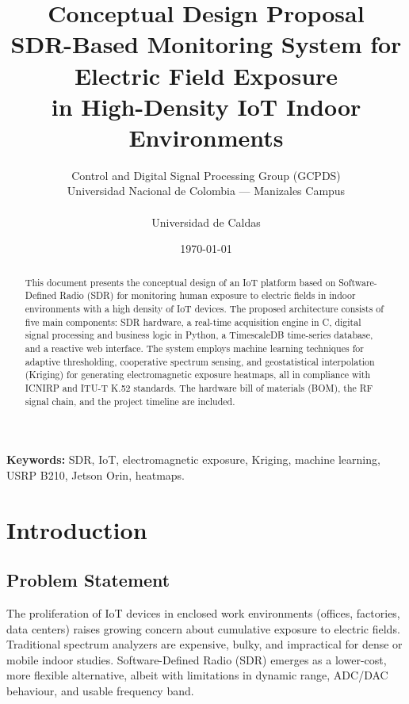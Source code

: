 \documentclass[12pt,a4paper]{article}
\title{
  \vspace{-2cm}
  \textbf{Conceptual Design Proposal}\\[0.3cm]
  \large SDR-Based Monitoring System for Electric Field Exposure\\
  in High-Density IoT Indoor Environments
}
\author{
  \small
  Control and Digital Signal Processing Group (GCPDS)\\
  Universidad Nacional de Colombia --- Manizales Campus\\
  \vspace{0.2cm}\\
  Universidad de Caldas
}
\date{\small \today}
\begin{document}
\maketitle
\thispagestyle{empty}

\begin{abstract}
\noindent
This document presents the conceptual design of an IoT platform based on Software-Defined Radio (SDR) for monitoring human exposure to electric fields in indoor environments with a high density of IoT devices. The proposed architecture consists of five main components: SDR hardware, a real-time acquisition engine in C, digital signal processing and business logic in Python, a TimescaleDB time-series database, and a reactive web interface. The system employs machine learning techniques for adaptive thresholding, cooperative spectrum sensing, and geostatistical interpolation (Kriging) for generating electromagnetic exposure heatmaps, all in compliance with ICNIRP and ITU-T K.52 standards. The hardware bill of materials (BOM), the RF signal chain, and the project timeline are included.
\end{abstract}

\vspace{1cm}
{\small
\noindent\textbf{Keywords:} SDR, IoT, electromagnetic exposure, Kriging, machine learning, USRP B210, Jetson Orin, heatmaps.
}

\newpage
\tableofcontents
\newpage

\section{Introduction}

\subsection{Problem Statement}

The proliferation of IoT devices in enclosed work environments (offices, factories, data centers) raises growing concern about cumulative exposure to electric fields. Traditional spectrum analyzers are expensive, bulky, and impractical for dense or mobile indoor studies. Software-Defined Radio (SDR) emerges as a lower-cost, more flexible alternative, albeit with limitations in dynamic range, ADC/DAC behaviour, and usable frequency band.
\end{document}
